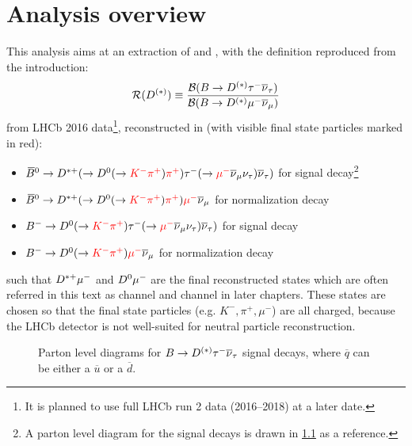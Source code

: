 \chapter{Analysis overview}
\label{ref:overview}

This analysis aims at an extraction of \RD and \RDst,
with the definition reproduced from the introduction:
\begin{equation}
    \mathcal{R}(D^{(*)}) \equiv \frac{\mathcal{B}(B \rightarrow D^{(*)} {\tau^-} {{\overline{\nu}}_\tau})}{\mathcal{B}(B \rightarrow D^{(*)} {\mu^-} {{\overline{\nu}}_\mu})}
\end{equation}
from LHCb 2016 data\footnote{
    It is planned to use full LHCb run 2 data (2016--2018) at a later date.
}, reconstructed in (with visible final state particles marked in red):
\begin{itemize}
    \item ${{\kern 0.18em\overline{\kern -0.18em B}}{}^0} \rightarrow {\ensuremath{{D}^{*+}}} (\rightarrow {\ensuremath{{D}^0}} (\rightarrow \textcolor{red}{{{K}^-} {{\pi}^+}})\textcolor{red}{{{\pi}^+}}) {\tau^-} (\rightarrow \textcolor{red}{{\mu^-}} {{\overline{\nu}}_\mu} {{\nu}_\tau}) {{\overline{\nu}}_\tau})$
        for \RDst signal decay\footnote{
            A parton level diagram for the signal decays is drawn in
            \cref{fig:decay-diagrams} as a reference.
        }
    \item ${{\kern 0.18em\overline{\kern -0.18em B}}{}^0} \rightarrow {\ensuremath{{D}^{*+}}} (\rightarrow {\ensuremath{{D}^0}} (\rightarrow \textcolor{red}{{{K}^-} {{\pi}^+}})\textcolor{red}{{{\pi}^+}}) \textcolor{red}{{\mu^-}} {{\overline{\nu}}_\mu}$
        for \RDst normalization decay
    \item ${{{B}^-}} \rightarrow {\ensuremath{{D}^0}} (\rightarrow \textcolor{red}{{{K}^-} {{\pi}^+}}) {\tau^-} (\rightarrow \textcolor{red}{{\mu^-}} {{\overline{\nu}}_\mu} {{\nu}_\tau}) {{\overline{\nu}}_\tau})$
        for \RD signal decay
    \item ${{{B}^-}} \rightarrow {\ensuremath{{D}^0}} (\rightarrow \textcolor{red}{{{K}^-} {{\pi}^+}}) \textcolor{red}{{\mu^-}} {{\overline{\nu}}_\mu}$
        for \RD normalization decay
\end{itemize}
such that ${{D}^{*+}}{\mu^-}$ and ${{D}^0}{\mu^-}$ are the final reconstructed states
which are often referred in this text as \Dstar channel and \Dz channel in later
chapters.
These states are chosen so that the final state particles
(e.g. $K^-, \pi^+, \mu^-$) are all charged,
because the LHCb detector is not well-suited for neutral particle
reconstruction.

\begin{figure}[!htb]
    \centering
    \resizebox{0.8\textwidth}{!}{
        
    }

    \caption{
        Parton level diagrams for $B \rightarrow D^{(*)} {\tau^-}{{\overline{\nu}}_\tau}$ signal
        decays,
        where $\overline q$ can be either a $\overline u$ or a $\overline d$.
    }
    \label{fig:decay-diagrams}
\end{figure}


